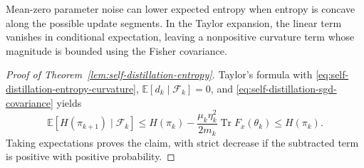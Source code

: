 \begin{insight}
Mean-zero parameter noise can lower expected entropy when entropy is
concave along the possible update segments.
In the Taylor expansion, the linear term vanishes in conditional expectation,
leaving a nonpositive curvature term whose magnitude is bounded using the Fisher covariance.
\end{insight}

\begin{proof}[Proof of Theorem~\ref{lem:self-distillation-entropy}]
Taylor's formula with \eqref{eq:self-distillation-entropy-curvature},
$\mathbb E[d_k\mid\mathcal F_k]=0$, and
\eqref{eq:self-distillation-sgd-covariance} yields
\begin{equation}
 \mathbb E[H(\pi_{k+1})\mid\mathcal F_k]
 \le H(\pi_k)-\frac{\mu_k\eta_k^2}{2m_k}
       \operatorname{Tr}F_x(\theta_k)
 \le H(\pi_k).
 \label{eq:self-distillation-entropy-bound}
\end{equation}
Taking expectations proves the claim, with strict decrease if the
subtracted term is positive with positive probability.
\end{proof}
